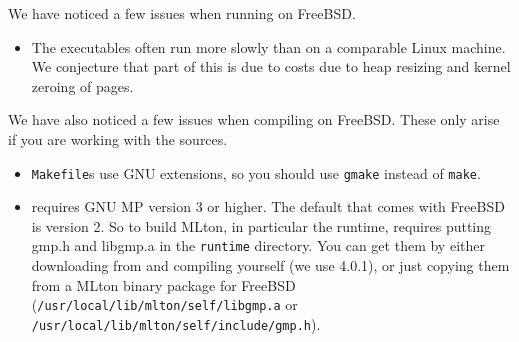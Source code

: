 
We have noticed a few issues when running {\mlton} on FreeBSD.  

\begin{itemize}

\item The executables often run more slowly than on a comparable Linux machine.
We conjecture that part of this is due to costs due to heap resizing and kernel
zeroing of pages.

\end{itemize}

We have also noticed a few issues when compiling {\mlton} on FreeBSD.  These
only arise if you are working with the {\mlton} sources.

\begin{itemize}

\item {\mlton} {\tt Makefile}s use GNU extensions, so you should use {\tt gmake}
instead of {\tt make}.

\item {\mlton} requires GNU MP version 3 or higher.  The default that comes with
FreeBSD is version 2.  So to build MLton, in particular the runtime, requires
putting gmp.h and libgmp.a in the {\tt runtime} directory.  You can get them
by either downloading from 
and compiling yourself (we use 4.0.1), or just copying them from a MLton
binary package for FreeBSD ({\tt /usr/local/lib/mlton/self/libgmp.a} or {\tt
/usr/local/lib/mlton/self/include/gmp.h}).

\end{itemize}
